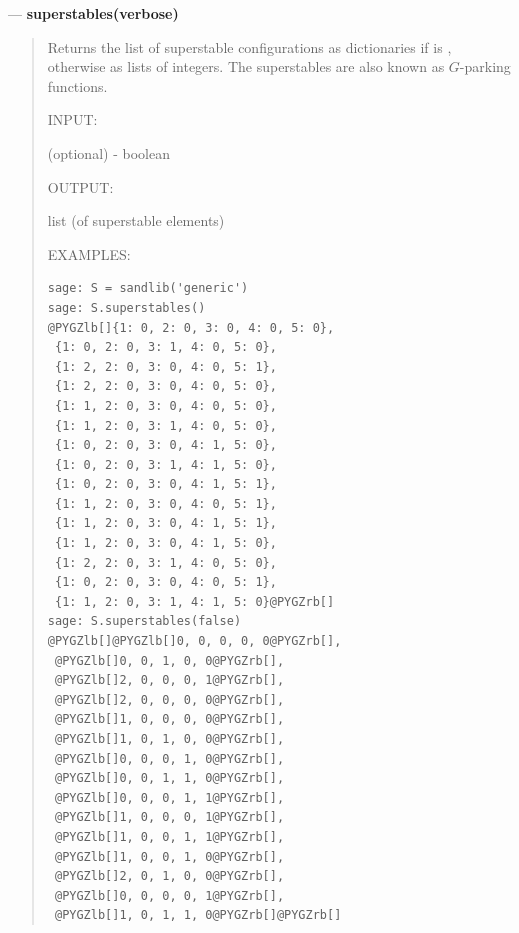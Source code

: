 \documentclass[letterpaper,10pt,english]{manual}
\begin{document}
---
\hypertarget{superstables-verbose}{}
\textbf{superstables(verbose)}
\begin{quote}

Returns the list of superstable configurations as dictionaries if
 is , otherwise as lists of integers.  The
superstables are also known as $G$-parking functions.

INPUT:

 (optional) - boolean

OUTPUT:

list (of superstable elements)

EXAMPLES:

\begin{Verbatim}[commandchars=@\[\]]
sage: S = sandlib('generic')
sage: S.superstables()
@PYGZlb[]{1: 0, 2: 0, 3: 0, 4: 0, 5: 0},
 {1: 0, 2: 0, 3: 1, 4: 0, 5: 0},
 {1: 2, 2: 0, 3: 0, 4: 0, 5: 1},
 {1: 2, 2: 0, 3: 0, 4: 0, 5: 0},
 {1: 1, 2: 0, 3: 0, 4: 0, 5: 0},
 {1: 1, 2: 0, 3: 1, 4: 0, 5: 0},
 {1: 0, 2: 0, 3: 0, 4: 1, 5: 0},
 {1: 0, 2: 0, 3: 1, 4: 1, 5: 0},
 {1: 0, 2: 0, 3: 0, 4: 1, 5: 1},
 {1: 1, 2: 0, 3: 0, 4: 0, 5: 1},
 {1: 1, 2: 0, 3: 0, 4: 1, 5: 1},
 {1: 1, 2: 0, 3: 0, 4: 1, 5: 0},
 {1: 2, 2: 0, 3: 1, 4: 0, 5: 0},
 {1: 0, 2: 0, 3: 0, 4: 0, 5: 1},
 {1: 1, 2: 0, 3: 1, 4: 1, 5: 0}@PYGZrb[]
sage: S.superstables(false)
@PYGZlb[]@PYGZlb[]0, 0, 0, 0, 0@PYGZrb[],
 @PYGZlb[]0, 0, 1, 0, 0@PYGZrb[],
 @PYGZlb[]2, 0, 0, 0, 1@PYGZrb[],
 @PYGZlb[]2, 0, 0, 0, 0@PYGZrb[],
 @PYGZlb[]1, 0, 0, 0, 0@PYGZrb[],
 @PYGZlb[]1, 0, 1, 0, 0@PYGZrb[],
 @PYGZlb[]0, 0, 0, 1, 0@PYGZrb[],
 @PYGZlb[]0, 0, 1, 1, 0@PYGZrb[],
 @PYGZlb[]0, 0, 0, 1, 1@PYGZrb[],
 @PYGZlb[]1, 0, 0, 0, 1@PYGZrb[],
 @PYGZlb[]1, 0, 0, 1, 1@PYGZrb[],
 @PYGZlb[]1, 0, 0, 1, 0@PYGZrb[],
 @PYGZlb[]2, 0, 1, 0, 0@PYGZrb[],
 @PYGZlb[]0, 0, 0, 0, 1@PYGZrb[],
 @PYGZlb[]1, 0, 1, 1, 0@PYGZrb[]@PYGZrb[]
\end{Verbatim}
\end{quote}
\end{document}
